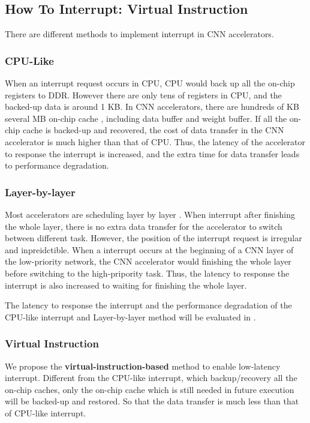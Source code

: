 \subsection{How To Interrupt: Virtual Instruction}
\label{sec:howinter}

There are different methods to implement interrupt in CNN accelerators.

\subsubsection{CPU-Like}
When an interrupt request occurs in CPU, CPU would back up all the on-chip registers to DDR. However there are only tens of registers in CPU, and the backed-up data is around 1 KB. In CNN accelerators, there are hundreds of KB ~ several MB on-chip cache \cite{qiu2016going, yu2018instruction}, including data buffer and weight buffer. If all the on-chip cache is backed-up and recovered, the cost of data transfer in the CNN accelerator is much higher than that of CPU. Thus, the latency of the accelerator to response the interrupt is increased, and the extra time for data transfer leads to performance degradation.

\subsubsection{Layer-by-layer}
Most accelerators are scheduling layer by layer \cite{qiu2016going,guo2017angel}. When interrupt after finishing the whole layer, there is no extra data transfer for the accelerator to switch between different task. However, the position of the interrupt request is irregular and inpreidctible. When a interrupt occurs at the beginning of a CNN layer of the low-priority network, the CNN accelerator would finishing the whole layer before switching to the high-pripority task. Thus, the latency to response the interrupt is also increased to waiting for finishing the whole layer.

The latency to response the interrupt and the performance degradation of the CPU-like interrupt and Layer-by-layer method will be evaluated in .

\subsubsection{Virtual Instruction}
\label{sec:vitualinter}
We propose the \textbf{virtual-instruction-based} method to enable low-latency interrupt. Different from the CPU-like interrupt, which backup/recovery all the on-chip caches, only the on-chip cache which is still needed in future execution will be backed-up and restored. So that the data transfer is much less than that of CPU-like interrupt.

